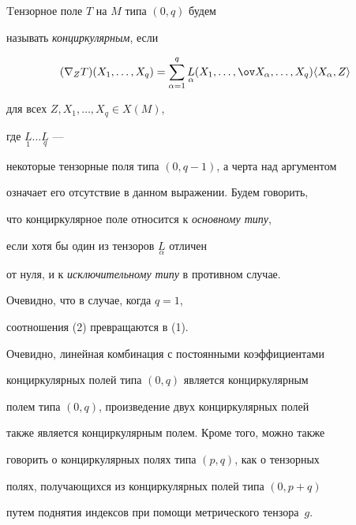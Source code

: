 \begin{defn}


Tензорное поле $T$ на $M$ типа $(0,q)$ будем 


называть {\it конциркулярным}, если


\begin{equation}


(\nabla_{Z}T)(X_{1},\dotsc,X_{q})=\sum_{\alpha=1}^q


\underset{\alpha}{L}{} (X_{1},\dotsc,\ov X_{\alpha },\dotsc,


X_{q})\la X_{\alpha }, Z\ra


\end{equation}


для всех $Z, X_{1},\dotsc,X_{q} \in X(M)$,


где $\underset{1}{L}{} \dotsc \underset{q}{L}$ ---


некоторые тензорные поля типа $(0, q-1)$, а черта над аргументом 


означает его отсутствие в данном выражении. Будем говорить, 


что конциркулярное поле относится к {\it основному типу}, 


если хотя бы один из тензоров $\underset{\alpha}{L}$ отличен 


от нуля, и к {\it исключительному типу} в противном случае.


\end{defn}





Очевидно, что в случае, когда $q = 1$,


соотношения (2) превращаются в (1).





\begin{note}


Очевидно, линейная комбинация с постоянными коэффициентами 


конциркулярных полей типа $(0, q)$ является конциркулярным


полем типа $(0, q)$, произведение двух конциркулярных полей 


также является конциркулярным полем. Кроме того, можно также 


говорить о конциркулярных полях типа $(p, q)$, как о тензорных 


полях, получающихся из конциркулярных полей типа $(0,p+q)$


путем поднятия индексов при помощи метрического тензора~$g$.


\end{note}





